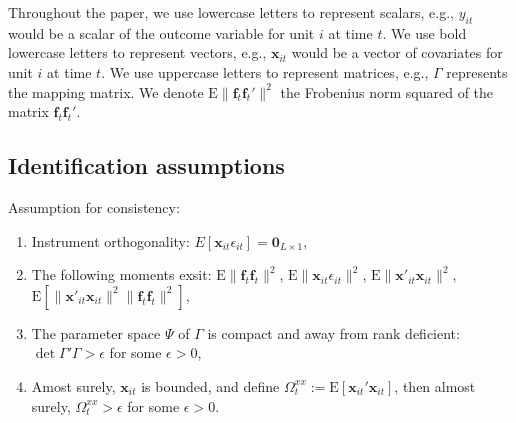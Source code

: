 \documentclass[12pt]{article}
\begin{document}
Throughout the paper, we use lowercase letters to represent scalars, e.g., $y_{it}$ would be a scalar of the outcome variable for unit $i$ at time $t$. We use bold lowercase letters to represent vectors, e.g., $\mathbf{x}_{it}$ would be a vector of covariates for unit $i$ at time $t$. We use uppercase letters to represent matrices, e.g., $\Gamma$ represents the mapping matrix. We denote $\mathrm{E}\|\mathbf{f}_t\mathbf{f}_t'\|^2$ the Frobenius norm squared of the matrix $\mathbf{f}_t\mathbf{f}_t'$.


\subsection{Identification assumptions}

\begin{assumption}
Assumption for consistency:
\begin{enumerate}
    \item Instrument orthogonality: $E\left[\textbf{x}_{it} \epsilon_{it}\right] = \textbf{0}_{L\times 1}$,
    
    \item The following moments exsit: $\mathrm{E}\|\mathbf{f}_{t}\mathbf{f}_{t}\|^2$, $\mathrm{E}\|\mathbf{x}_{it}\epsilon_{it}\|^2$, $\mathrm{E}\|\mathbf{x}'_{it}\mathbf{x}_{it}\|^2$, $\mathrm{E}\left[\|\mathbf{x}'_{it}\mathbf{x}_{it}\|^2\|\mathbf{f}_{t}\mathbf{f}_{t}\|^2 \right]$, 
    
    \item The parameter space $\Psi$ of $\Gamma$ is compact and away from rank deficient: $\det{\Gamma' \Gamma} > \epsilon$ for some $\epsilon>0$,
    
    \item Amost surely, $\mathbf{x}_{it}$ is bounded, and define $\Omega_t^{xx} := \mathrm{E}\left[ \mathbf{x}_{it}' \mathbf{x}_{it} \right]$, then almost surely, $\Omega_t^{xx} > \epsilon$ for some $\epsilon > 0$.
\end{enumerate}
\label{app: ass consistency}
\end{assumption}
\end{document}
